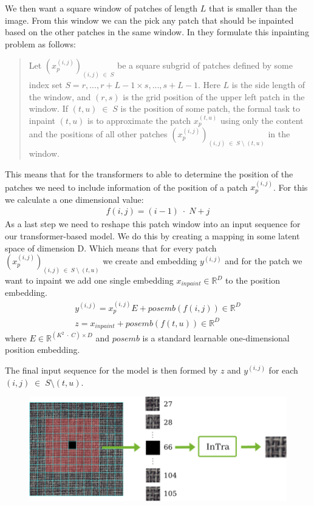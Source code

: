 We then want a square window of patches of length $L$ that is smaller than the image. From this window we can the pick any patch that should be inpainted based on the other patches in the same window. In \cite{pirnay_inpainting_2021} they formulate this inpainting problem as follows:

\begin{quote}
Let $(x_p^{(i,j)})_{(i,j) \;\in\; S}$ be a square subgrid of patches defined by some index set $S = {r,...,r+L-1} \times {s,...,s+L-1}$. Here $L$ is the side length of the window, and $(r,s)$ is the grid position of the upper left patch in the window. If $(t, u) \;\in\; S$ is the position of some patch, the formal task to inpaint $(t,u)$ is to approximate the patch $x_p^{(t,u)}$ using only the content and the positions of all other patches $(x_p^{(i,j)})_{(i,j) \;\in\; S \;\setminus\; {(t,u)}}$ in the window.
\end{quote}

This means that for the transformers to able to determine the position of the patches we need to include information of the position of a patch $x_p^{(i,j)}$. For this we calculate a one dimensional value:
%
\begin{align}
f(i,j) = (i-1) \;\cdot\; N + j 
\end{align}
%
As a last step we need to reshape this patch window into an input sequence for our transformer-based model. We do this by creating a mapping in some latent space of dimension D. Which means that for every patch $(x_p^{(i,j)})_{(i,j) \;\in\; S \;\setminus\; {(t,u)}}$ we create and embedding $y^(i,j)$ and for the patch we want to inpaint we add one single embedding $x_{inpaint} \in \mathbb{R}^D$ to the position embedding.
%
\begin{align}
y^{(i,j)} = x_p^{(i,j)}E + posemb(f(i, j)) \in \mathbb{R}^D\\
z = x_{inpaint} + posemb(f(t, u)) \in \mathbb{R}^D
\end{align}
%
where $E \in \mathbb{R}^{(K^2 \;\cdot\; C) \times D}$ and $posemb$ is a standard learnable one-dimensional position embedding.

The final input sequence for the model is then formed by $z$ and $y^{(i, j)}$ for each $(i, j) \;\in\; S \setminus {(t,u)}$.

\begin{figure}[ht!]
\centering
\includegraphics[width=\textwidth]{imgs/intra-overview.png}
\label{fig:experimental-setup:intra-overview}
\end{figure}
\caption{An overview of the inpainting transformer steps by Pirnay et al. \cite{pirnay_inpainting_2021}}
